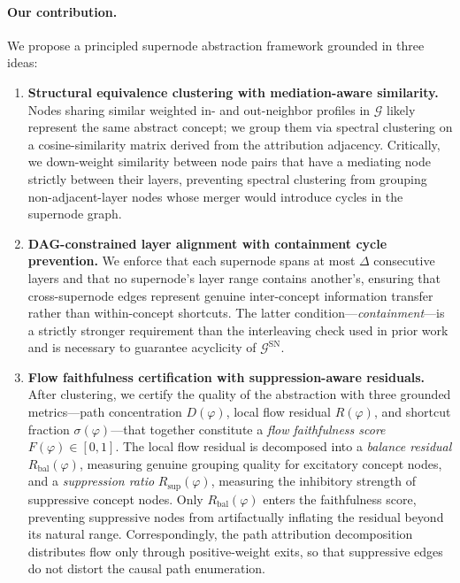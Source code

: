\documentclass[11pt]{article}
\newcommand{\cG}{\mathcal{G}}
\newcommand{\1}{\mathbbm{1}}
\newcommand{\Dphi}{D(\varphi)}
\newcommand{\Rphi}{R(\varphi)}
\newcommand{\Rbal}{R_{\mathrm{bal}}(\varphi)}
\newcommand{\Rsup}{R_{\mathrm{sup}}(\varphi)}
\newcommand{\Fphi}{F(\varphi)}
\begin{document}
\paragraph{Our contribution.}
We propose a principled supernode abstraction framework grounded in three ideas:
\begin{enumerate}[leftmargin=2em]
  \item \textbf{Structural equivalence clustering with mediation-aware similarity.}
        Nodes sharing similar weighted in- and out-neighbor profiles in $\cG$ likely represent the same abstract concept; we group them via spectral clustering on a cosine-similarity matrix derived from the attribution adjacency.
        Critically, we down-weight similarity between node pairs that have a mediating node strictly between their layers, preventing spectral clustering from grouping non-adjacent-layer nodes whose merger would introduce cycles in the supernode graph.

  \item \textbf{DAG-constrained layer alignment with containment cycle prevention.}
        We enforce that each supernode spans at most $\Delta$ consecutive layers and that no supernode's layer range contains another's, ensuring that cross-supernode edges represent genuine inter-concept information transfer rather than within-concept shortcuts.
        The latter condition---\emph{containment}---is a strictly stronger requirement than the interleaving check used in prior work and is necessary to guarantee acyclicity of $\cG^{\mathrm{SN}}$.

  \item \textbf{Flow faithfulness certification with suppression-aware residuals.}
        After clustering, we certify the quality of the abstraction with three grounded metrics---path concentration $\Dphi$, local flow residual $\Rphi$, and shortcut fraction $\sigma(\varphi)$---that together constitute a \emph{flow faithfulness score} $\Fphi \in [0,1]$.
        The local flow residual is decomposed into a \emph{balance residual} $\Rbal$, measuring genuine grouping quality for excitatory concept nodes, and a \emph{suppression ratio} $\Rsup$, measuring the inhibitory strength of suppressive concept nodes.
        Only $\Rbal$ enters the faithfulness score, preventing suppressive nodes from artifactually inflating the residual beyond its natural range.
        Correspondingly, the path attribution decomposition distributes flow only through positive-weight exits, so that suppressive edges do not distort the causal path enumeration.
\end{enumerate}
\end{document}
